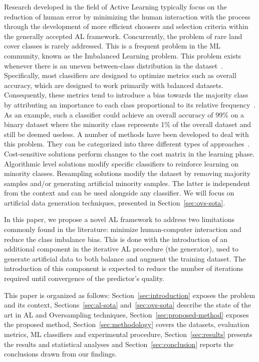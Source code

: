 \documentclass[parskip=full]{scrartcl}
\begin{document}
Research developed in the field of Active Learning typically focus on the
reduction of human error by minimizing the human interaction with the process
through the development of more efficient choosers and selection criteria within
the generally accepted AL framework.  Concurrently, the problem of rare land
cover classes is rarely addressed. This is a frequent problem in the ML
community, known as the Imbalanced Learning problem.  This problem exists
whenever there is an uneven between-class distribution in the
dataset~\cite{Chawla2004}. Specifically, most classifiers are designed to
optimize metrics such as overall accuracy, which are designed to work primarily
with balanced datasets. Consequently, these metrics tend to introduce a bias
towards the majority class by attributing an importance to each class
proportional to its relative frequency~\cite{Maxwell2018}. As an example, such a
classifier could achieve an overall accuracy of 99\% on a binary dataset where
the minority class represents 1\% of the overall dataset and still be deemed
useless. A number of methods have been developed to deal with this problem. They
can be categorized into three different types of
approaches~\cite{Fernandez2013,Kaur2019}. Cost-sensitive solutions perform
changes to the cost matrix in the learning phase. Algorithmic level solutions
modify specific classifiers to reinforce learning on minority classes.
Resampling solutions modify the dataset by removing majority samples and/or
generating artificial minority samples. The latter is independent from the
context and can be used alongside any classifier. We will focus on artificial
data generation techniques, presented in Section~\ref{sec:ovs-sota}.

In this paper, we propose a novel AL framework to address two limitations
commonly found in the literature: minimize human-computer interaction and reduce
the class imbalance bias. This is done with the introduction of an additional
component in the iterative AL procedure (the generator), used to generate
artificial data to both balance and augment the training dataset. The
introduction of this component is expected to reduce the number of iterations
required until convergence of the predictor's quality.

This paper is organized as follows: Section~\ref{sec:introduction} exposes the
problem and its context, Sections~\ref{sec:al-sota} and~\ref{sec:ovs-sota}
describe the state of the art in AL and Oversampling techniques,
Section~\ref{sec:proposed-method} exposes the proposed method,
Section~\ref{sec:methodology} covers the datasets, evaluation metrics, ML
classifiers and experimental procedure, Section~\ref{sec:results} presents the
results and statistical analyses and Section~\ref{sec:conclusion} reports the
conclusions drawn from our findings.
\end{document}
